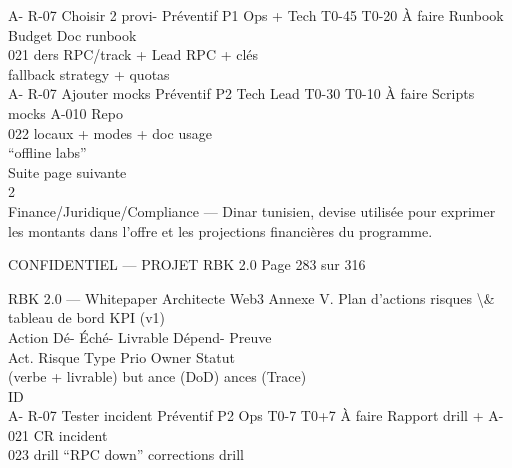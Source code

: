 A- R-07    Choisir 2 provi-      Préventif P1    Ops + Tech   T0-45 T0-20 À faire   Runbook         Budget     Doc runbook\\
021        ders RPC/track +                      Lead                               RPC + clés\\
fallback strategy                                                        + quotas\\
A- R-07    Ajouter mocks         Préventif P2    Tech Lead    T0-30 T0-10 À faire   Scripts mocks   A-010      Repo\\
022        locaux + modes                                                           + doc usage\\
“offline labs”\\
Suite page suivante\\
\vspace{0.5em}
\vspace{0.5em}
\vspace{0.5em}
2\\
Finance/Juridique/Compliance — Dinar tunisien, devise utilisée pour exprimer les montants dans l’offre et les projections financières du programme.\\
\vspace{0.5em}
\vspace{0.5em}
\begin{confidential}CONFIDENTIEL — PROJET RBK 2.0                                                     Page 283 sur 316\end{confidential}
RBK 2.0 — Whitepaper Architecte Web3                                                                Annexe V. Plan d’actions risques \textbackslash{}& tableau de bord KPI (v1)\\
\vspace{0.5em}
\vspace{0.5em}
Action                                          Dé- Éché-             Livrable        Dépend- Preuve\\
Act. Risque                      Type      Prio Owner                   Statut\\
(verbe + livrable)                              but ance              (DoD)           ances   (Trace)\\
ID\\
A- R-07     Tester incident      Préventif P2   Ops         T0-7 T0+7 À faire     Rapport drill + A-021      CR incident\\
023         drill “RPC down”                                                      corrections                drill\\

